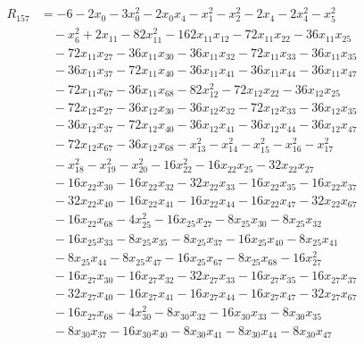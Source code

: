 \begin{align*}
R_{157} &= -6 -2 x_{0} -3 x_{0}^{2} -2 x_{0} x_{4} -x_{1}^{2} -x_{2}^{2} -2 x_{4} -2 x_{4}^{2} -x_{5}^{2} \\
&\quad -x_{6}^{2} +2 x_{11} -82 x_{11}^{2} -162 x_{11} x_{12} -72 x_{11} x_{22} -36 x_{11} x_{25} \\
&\quad -72 x_{11} x_{27} -36 x_{11} x_{30} -36 x_{11} x_{32} -72 x_{11} x_{33} -36 x_{11} x_{35} \\
&\quad -36 x_{11} x_{37} -72 x_{11} x_{40} -36 x_{11} x_{41} -36 x_{11} x_{44} -36 x_{11} x_{47} \\
&\quad -72 x_{11} x_{67} -36 x_{11} x_{68} -82 x_{12}^{2} -72 x_{12} x_{22} -36 x_{12} x_{25} \\
&\quad -72 x_{12} x_{27} -36 x_{12} x_{30} -36 x_{12} x_{32} -72 x_{12} x_{33} -36 x_{12} x_{35} \\
&\quad -36 x_{12} x_{37} -72 x_{12} x_{40} -36 x_{12} x_{41} -36 x_{12} x_{44} -36 x_{12} x_{47} \\
&\quad -72 x_{12} x_{67} -36 x_{12} x_{68} -x_{13}^{2} -x_{14}^{2} -x_{15}^{2} -x_{16}^{2} -x_{17}^{2} \\
&\quad -x_{18}^{2} -x_{19}^{2} -x_{20}^{2} -16 x_{22}^{2} -16 x_{22} x_{25} -32 x_{22} x_{27} \\
&\quad -16 x_{22} x_{30} -16 x_{22} x_{32} -32 x_{22} x_{33} -16 x_{22} x_{35} -16 x_{22} x_{37} \\
&\quad -32 x_{22} x_{40} -16 x_{22} x_{41} -16 x_{22} x_{44} -16 x_{22} x_{47} -32 x_{22} x_{67} \\
&\quad -16 x_{22} x_{68} -4 x_{25}^{2} -16 x_{25} x_{27} -8 x_{25} x_{30} -8 x_{25} x_{32} \\
&\quad -16 x_{25} x_{33} -8 x_{25} x_{35} -8 x_{25} x_{37} -16 x_{25} x_{40} -8 x_{25} x_{41} \\
&\quad -8 x_{25} x_{44} -8 x_{25} x_{47} -16 x_{25} x_{67} -8 x_{25} x_{68} -16 x_{27}^{2} \\
&\quad -16 x_{27} x_{30} -16 x_{27} x_{32} -32 x_{27} x_{33} -16 x_{27} x_{35} -16 x_{27} x_{37} \\
&\quad -32 x_{27} x_{40} -16 x_{27} x_{41} -16 x_{27} x_{44} -16 x_{27} x_{47} -32 x_{27} x_{67} \\
&\quad -16 x_{27} x_{68} -4 x_{30}^{2} -8 x_{30} x_{32} -16 x_{30} x_{33} -8 x_{30} x_{35} \\
&\quad -8 x_{30} x_{37} -16 x_{30} x_{40} -8 x_{30} x_{41} -8 x_{30} x_{44} -8 x_{30} x_{47} \\

\end{align*}
